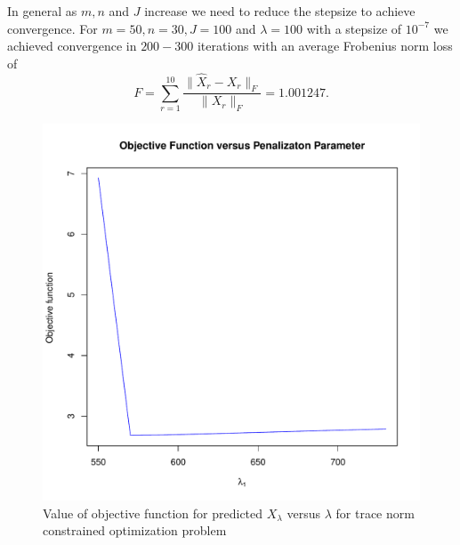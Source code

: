 \documentclass[12pt, leqno]{article}
\providecommand{\norm}[1]{\lVert#1\rVert}
\let\oldhat\hat
\renewcommand{\hat}[1]{\oldhat{{#1}}}
\begin{document}
In general as $m,n$ and $J$ increase we need to reduce the stepsize
to achieve convergence. For $m = 50,n=30, J = 100$ and $\lambda = 100$ with a
stepsize of $10^{-7}$ we achieved convergence in $200-300$ iterations
with an average Frobenius norm loss of 
\[
F = \sum_{r = 1}^{10}\frac{\norm{\hat{X}_r-X_r}_F}{\norm{X_r}_F} =   1.001247.
\]
\begin{figure}
\begin{center}
                \includegraphics[scale = 0.4]{takehome3cv.pdf}
                \caption{Value of objective function for predicted $X_{\lambda}$ versus $\lambda$ for trace norm
                  constrained optimization problem}
                \label{fig:no3cv}
\end{center}
\end{figure}
\end{document}
